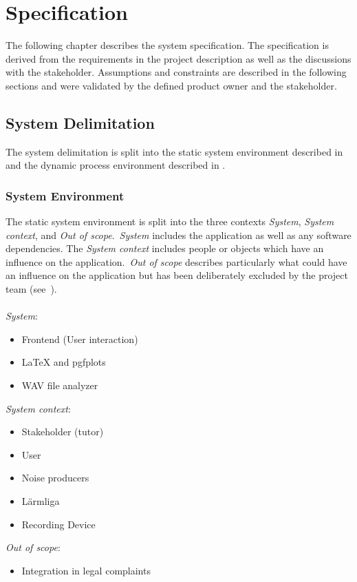 \section{Specification}\label{sec:specification}
The following chapter describes the system specification.
The specification is derived from the requirements in the project description
as well as the discussions with the stakeholder.
Assumptions and constraints are described in the following sections and were validated by
the defined product owner and the stakeholder.

\subsection{System Delimitation}\label{subsec:system-delimination}
The system delimitation is split into the static system environment described in 
and the dynamic process environment described in .

\subsubsection{System Environment}\label{subsubsec:system_environment}
The static system environment is split into the three contexts \textit{System}, \textit{System context}, and \textit{Out of scope}.\ \textit{System} includes the application
as well as any software dependencies.
The \textit{System context} includes people or objects which have an influence on the application.\ \textit{Out of scope} describes particularly
what could have an influence on the application but has been deliberately excluded by the project team (see~). \\~\\
\textit{System}:
\begin{itemize}
    \item Frontend (User interaction)
    \item LaTeX and pgfplots
    \item WAV file analyzer
\end{itemize}
\textit{System context}:
\begin{itemize}
    \item Stakeholder (tutor)
    \item User
    \item Noise producers
    \item Lärmliga
    \item Recording Device
\end{itemize}
\textit{Out of scope}:
\begin{itemize}
    \item Integration in legal complaints
\end{itemize}

